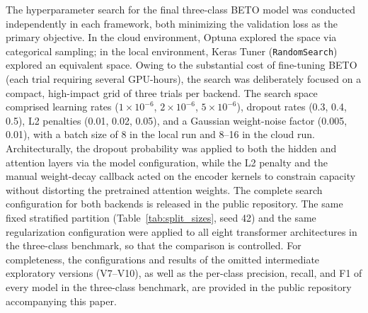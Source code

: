 \documentclass[informatics,article,accept,pdftex,moreauthors]{Definitions/mdpi}
\begin{document}
The hyperparameter search for the final three-class BETO model was conducted independently in each framework, both minimizing the validation loss as the primary objective. In the cloud environment, Optuna explored the space via categorical sampling; in the local environment, Keras Tuner (\texttt{RandomSearch}) explored an equivalent space. Owing to the substantial cost of fine-tuning BETO (each trial requiring several GPU-hours), the search was deliberately focused on a compact, high-impact grid of three trials per backend. The search space comprised learning rates ($1 \times 10^{-6}$, $2 \times 10^{-6}$, $5 \times 10^{-6}$), dropout rates (0.3, 0.4, 0.5), L2 penalties (0.01, 0.02, 0.05), and a Gaussian weight-noise factor (0.005, 0.01), with a batch size of 8 in the local run and 8--16 in the cloud run. Architecturally, the dropout probability was applied to both the hidden and attention layers via the model configuration, while the L2 penalty and the manual weight-decay callback acted on the encoder kernels to constrain capacity without distorting the pretrained attention weights. The complete search configuration for both backends is released in the public repository. The same fixed stratified partition (Table~\ref{tab:split_sizes}, seed 42) and the same regularization configuration were applied to all eight transformer architectures in the three-class benchmark, so that the comparison %
 is controlled. For completeness, the configurations and results of the omitted intermediate exploratory versions (V7--V10), as well as the per-class precision, recall, and F1 of every model in the three-class benchmark, are provided in the public repository accompanying this paper.

\vspace{-9pt}
\end{document}
